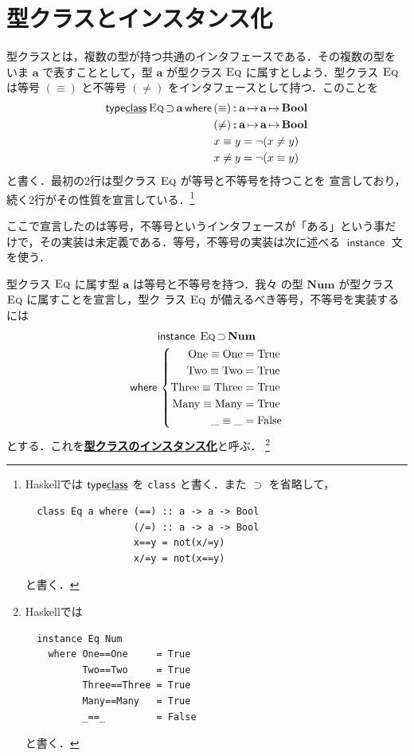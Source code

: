 \documentclass[a5paper,twoside,fleqn]{jsbook}
\newcommand{\programminglanguage}[1]{\textsf{#1}}
\newcommand{\haskell}{\programminglanguage{Haskell}}
\newcommand{\keyword}[1]{{\underline{\textbf{#1}}}}
\newcommand{\code}[1]{\texttt{#1}}
\newcommand{\mKeyword}[1]{\mathsf{#1}} %
\newcommand{\mKeywordUnderline}[1]{\text{\underline{\textsf{#1}}}} %
\newcommand{\mInstanceKeyword}{\mKeyword{instance}}
\newcommand{\mTypeClassKeyword}{\mKeyword{type}\mKeywordUnderline{class}}
\newcommand{\mWhereKeyword}{\mKeyword{where}}
\DeclareMathOperator{\mInstance}{\mInstanceKeyword}
\DeclareMathOperator{\mSuperSet}{\supset}
\DeclareMathOperator{\mTypeClass}{\mTypeClassKeyword}
\DeclareMathOperator{\mWhere}{\mWhereKeyword}
\newcommand{\mConstant}[1]{\mathrm{#1}}
\newcommand{\mSpecialConstant}[1]{\textrm{#1}} %
\newcommand{\mFalse}{\mSpecialConstant{False}}
\newcommand{\mTrue}{\mSpecialConstant{True}}
\newcommand{\mAnyParam}{\_}
\DeclareMathOperator{\mIn}{{:\!:}}
\DeclareMathOperator{\mMapsTo}{\mapsto}
\newcommand{\mType}[1]{\mathbf{#1}}
\newcommand{\mBoolType}{\mType{Bool}}
\newcommand{\mGenericTypeClass}[1]{\textsc{#1}} %
\newcommand{\mEqTypeClass}{\mGenericTypeClass{Eq}}
\newcommand{\mProj}[2]{#1\mMapsTo#2}
\begin{document}
\section{型クラスとインスタンス化}
\label{sec:type-class-and-instance}

型クラスとは，複数の型が持つ共通のインタフェースである．その複数の型を
いま $\mType{a}$ で表すこととして，型 $\mType{a}$ が型クラス
$\mEqTypeClass$ に属すとしよう．型クラス $\mEqTypeClass$ は等号
$(\equiv)$ と不等号 $(\neq)$ をインタフェースとして持つ．このことを
\begin{align}
\mTypeClass\mathop{\mEqTypeClass}\mSuperSet\mType{a}\mWhere{}
&(\equiv)\mIn\mProj{\mType{a}}{\mProj{\mType{a}}{\mBoolType}}\\
&(\neq)\mIn\mProj{\mType{a}}{\mProj{\mType{a}}{\mBoolType}}\\
&x\equiv y=\neg(x\neq y)\\
&x\neq y=\neg(x\equiv y)
\end{align}
と書く．最初の2行は型クラス $\mEqTypeClass$ が等号と不等号を持つことを
宣言しており，続く2行がその性質を宣言している．\footnote{\haskell では
$\mTypeClass$ を \code{class} と書く．また $\mSuperSet$ を省略して，
\begin{verbatim}
  class Eq a where (==) :: a -> a -> Bool
                   (/=) :: a -> a -> Bool
                   x==y = not(x/=y)
                   x/=y = not(x==y)
\end{verbatim}
と書く．}

ここで宣言したのは等号，不等号というインタフェースが「ある」という事だ
けで，その実装は未定義である．等号，不等号の実装は次に述べる
$\mInstance$ 文を使う．

型クラス $\mEqTypeClass$ に属す型 $\mType{a}$ は等号と不等号を持つ．我々
の型 $\mType{Num}$ が型クラス $\mEqTypeClass$ に属すことを宣言し，型ク
ラス $\mEqTypeClass$ が備えるべき等号，不等号を実装するには
\begin{multline}
\mInstance\;
\mEqTypeClass\mSuperSet\mType{Num}\\
\mWhere{}
\left\{
\begin{aligned}
\mConstant{One}\equiv\mConstant{One}&=\mTrue\\
\mConstant{Two}\equiv\mConstant{Two}&=\mTrue\\
\mConstant{Three}\equiv\mConstant{Three}&=\mTrue\\
\mConstant{Many}\equiv\mConstant{Many}&=\mTrue\\
\mAnyParam\equiv\mAnyParam&=\mFalse
\end{aligned}
\right.
\end{multline}
とする．これを\keyword{型クラスのインスタンス化}と呼ぶ．
\footnote{\haskell では
\begin{verbatim}
  instance Eq Num
    where One==One     = True
          Two==Two     = True
          Three==Three = True
          Many==Many   = True
          _==_         = False
\end{verbatim}
と書く．}
\end{document}
